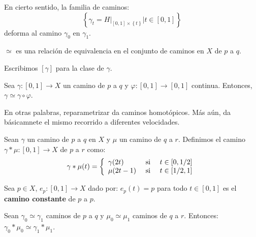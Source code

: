 \documentclass[12pt]{report}
\theoremstyle{largebreak}
\newcommand\cf[3]{\ensuremath{#1:#2\rightarrow#3}}
\begin{document}
    \begin{obs}
        En cierto sentido, la familia de caminos:
        \begin{equation*}
            \left\{\gamma_t=H\big|_{[0,1]\times\left\{t\right\}}\Big|t\in[0,1] \right\}
        \end{equation*}
        deforma al camino $\gamma_0$ en $\gamma_1$.
    \end{obs}

    \begin{propo}
        $\simeq$ es una relación de equivalencia en el conjunto de caminos en $X$ de $p$ a $q$.
    \end{propo}

    \begin{obs}
        Escribimos $[\gamma]$ para la clase de $\gamma$.
    \end{obs}
    
    \begin{lema}
        Sea $\cf{\gamma}{[0,1]}{X}$ un camino de $p$ a $q$ y $\cf{\varphi}{[0,1]}{[0,1]}$ continua. Entonces, $\gamma\simeq\gamma\circ\varphi$.
    \end{lema}

    En otras palabras, reparametrizar da caminos homotópicos. Más aún, da básicamnete el mismo recorrido a diferentes velocidades.

    \begin{mydef}
        Sean $\gamma$ un camino de $p$ a $q$ en $X$ y $\mu$ un camino de $q$ a $r$. Definimos el camino $\cf{\gamma*\mu}{[0,1]}{X}$ de $p$ a $r$ como:
        \begin{equation*}
            \gamma*\mu(t)=\left\{
                \begin{array}{lcr}
                    \gamma(2t) & \textup{ si } & t\in[0,1/2]\\
                    \mu(2t-1) & \textup{ si } & t\in[1/2,1]\\
                \end{array}
            \right.
        \end{equation*}
    \end{mydef}

    \begin{mydef}
        Sea $p\in X$, $\cf{e_p}{[0,1]}{X}$ dado por: $e_p(t)=p$ para todo $t\in[0,1]$ es el \textbf{camino constante} de $p$ a $p$.
    \end{mydef}

    \begin{lema}
        Sean $\gamma_0\simeq \gamma_1$ caminos de $p$ a $q$ y $\mu_0\simeq\mu_1$ caminos de $q$ a $r$. Entonces: $\gamma_0*\mu_0\simeq\gamma_1*\mu_1$.
    \end{lema}
\end{document}
